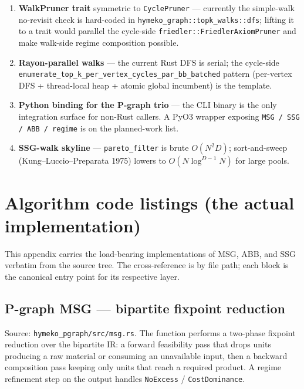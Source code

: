 \documentclass[11pt]{article}
\begin{document}
\begin{enumerate}[leftmargin=2em,itemsep=0pt]
  \item \textbf{WalkPruner trait} symmetric to \texttt{CyclePruner} ---
        currently the simple-walk no-revisit check is hard-coded in
        \texttt{hymeko\_graph::topk\_walks::dfs}; lifting it to a
        trait would parallel the cycle-side
        \texttt{friedler::FriedlerAxiomPruner} and make walk-side
        regime composition possible.
  \item \textbf{Rayon-parallel walks} --- the current Rust DFS is
        serial; the cycle-side
        \texttt{enumerate\_top\_k\_per\_vertex\_cycles\_par\_bb\_batched}
        pattern (per-vertex DFS + thread-local heap + atomic global
        incumbent) is the template.
  \item \textbf{Python binding for the P-graph trio} --- the CLI
        binary is the only integration surface for non-Rust callers.
        A PyO3 wrapper exposing \texttt{MSG / SSG / ABB / regime} is
        on the planned-work list.
  \item \textbf{SSG-walk skyline} --- \texttt{pareto\_filter} is
        brute $O(N^2 D)$; sort-and-sweep (Kung–Luccio–Preparata
        1975) lowers to $O(N \log^{D-1} N)$ for large pools.
\end{enumerate}

\appendix

\section{Algorithm code listings (the actual implementation)}
\label{app:code}

This appendix carries the load-bearing implementations of MSG, ABB,
and SSG verbatim from the source tree. The cross-reference is by
file path; each block is the canonical entry point for its
respective layer.

\subsection{P-graph MSG --- bipartite fixpoint reduction}
\label{app:code-pgraph-msg}

Source: \texttt{hymeko\_pgraph/src/msg.rs}. The function performs a
two-phase fixpoint reduction over the bipartite IR: a forward
feasibility pass that drops units producing a raw material or
consuming an unavailable input, then a backward composition pass
keeping only units that reach a required product. A regime
refinement step on the output handles \texttt{NoExcess} /
\texttt{CostDominance}.
\end{document}
